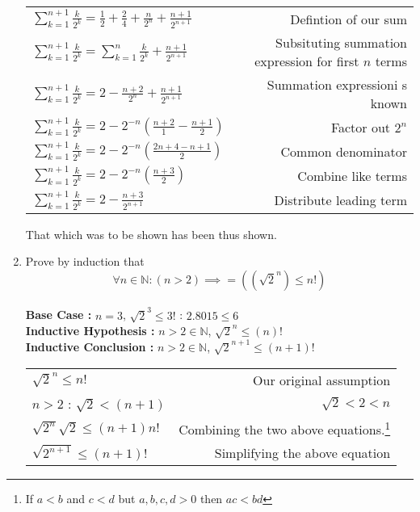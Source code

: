 \documentclass[a4paper,11pt]{article}
\begin{document}
\begin{enumerate}
\begin{tabular}{l | r}
$ \sum_{k = 1}^{n+1} \frac{k}{2^k}=\frac{1}{2}+\frac{2}{4}+\frac{n}{2^n}+\frac{n+1}{2^{n+1}} $  & Defintion of our sum \\[.1in]
$ \sum_{k = 1}^{n+1} \frac{k}{2^k} = \sum_{k = 1}^{n} \frac{k}{2^k} + \frac{n+1}{2^{n+1}} $     & Subsituting summation expression for first $n$ terms \\[.1in]
$ \sum_{k = 1}^{n+1} \frac{k}{2^k} = 2 - \frac{n+2}{2^n} + \frac{n+1}{2^{n+1}} $     			& Summation expressioni s known  \\[.1in]
$ \sum_{k = 1}^{n+1} \frac{k}{2^k} = 2 - 2^{-n}(\frac{n+2}{1} - \frac{n+1}{2}) $     & Factor out $2^n$ \\[.1in]
$ \sum_{k = 1}^{n+1} \frac{k}{2^k} = 2 - 2^{-n}(\frac{2n+4 - n+1}{2}) $              & Common denominator \\[.1in]
$ \sum_{k = 1}^{n+1} \frac{k}{2^k} = 2 - 2^{-n}(\frac{n+3}{2}) $                     & Combine like terms \\[.1in]
$ \sum_{k = 1}^{n+1} \frac{k}{2^k} = 2 - \frac{n+3}{2^{n+1}} $                       & Distribute leading term\\[.1in]
\end{tabular}

That which was to be shown has been thus shown.


\item Prove by induction that
$$ \forall n \in \mathbb{N} : (n > 2) \implies = ((\sqrt{2}^n) \leq n!)$$ \\
\textbf{ Base Case : } $n = 3$,  $ \sqrt{2}^3 \leq 3!$ : $2.8015 \leq 6$ \\[.1in]
\textbf{ Inductive Hypothesis : } $n > 2 \in \mathbb{N}$,  $ \sqrt{2}^{n} \leq (n)!$ \\[.1in]
\textbf{ Inductive Conclusion : } $n > 2 \in \mathbb{N}$,  $ \sqrt{2}^{n+1} \leq (n+1)!$ \\[.1in]
\begin{tabular}{l | r}
$\sqrt{2}^n \leq n!$                & Our original assumption \\
$n > 2$ : $\sqrt{2} < (n+1)$    &   $\sqrt{2} < 2 < n$  \\
$\sqrt{2^n}\sqrt{2} \leq (n+1)n!$   & Combining the two above equations.\footnote{If $a < b$ and $c < d$ but $a, b, c, d > 0$ then $ac < bd$}  \\
$\sqrt{2^{n+1}} \leq (n+1)! $       & Simplifying the above equation \\
\end{tabular}


\end{enumerate}
\end{document}
